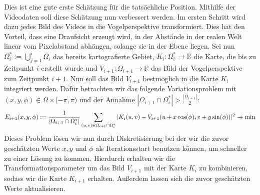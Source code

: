 Dies ist eine gute erste Schätzung für die tatsächliche Position. Mithilfe der Videodaten soll diese Schätzung nun verbessert werden. Im ersten Schritt wird dazu jedes Bild des Videos in die Vogelperspektive transformiert. Dies hat den Vorteil, dass eine Draufsicht erzeugt wird, in der Abstände in der realen Welt linear vom Pixelabstand abhängen, solange sie in der Ebene liegen. Sei nun 
$\Omega^*_{i}:=\bigcup_{j=1}^i\Omega_i$ das bereits kartografierte Gebiet,
$K_i:\Omega^*_{i} \rightarrow \mathbb{R}$ die Karte, die bis zu Zeitpunkt $i$ erstellt wurde und $V_{i+1}:\Omega_{i+1}\rightarrow \mathbb{R}$ das Bild der Vogelperspektive zum Zeitpunkt $i+1$. Nun soll das Bild $V_{i+1}$ bestmöglich in die Karte $K_i$ integriert werden. Dafür betrachten wir das folgende Variationsproblem mit $(x,y,\phi)\in \Omega \times [-\pi,\pi)$ und der Annahme $|\Omega_{i+1}\cap \Omega^*_i|>\frac{|\Omega_{i+1}|}{2}$:
$$E_{i+1}(x,y,\phi):= \frac{1}{|\Omega_{i+1}\cap \Omega^*_{i}|}\sum_{(u,v) \in \Omega_{i+1}\cap \Omega^*_{i}} |K_{i}(u,v)-V_{i+1}(u+x\cos(\phi),v+y\sin(\phi))|^2 \rightarrow \textnormal{min} $$
Dieses Problem lösen wir nun durch Diskretisierung bei der wir die zuvor geschätzten Werte $x,y$ und $\phi$ als Iterationsstart benutzen können, um schneller zu einer Lösung zu kommen. Hierdurch erhalten wir die Transformationsparameter um das Bild $V_{i+1}$ mit der Karte $K_i$ zu kombinieren, sodass wir die Karte $K_{i+1}$ erhalten. Außerdem lassen sich die zuvor geschätzten Werte aktualisieren.


